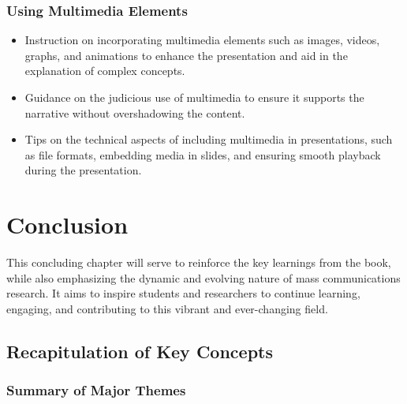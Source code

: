 \documentclass[
]{book}
\begin{document}
\hypertarget{using-multimedia-elements}{%
\subsection*{Using Multimedia Elements}\label{using-multimedia-elements}}

\begin{itemize}
\item
  Instruction on incorporating multimedia elements such as images, videos, graphs, and animations to enhance the presentation and aid in the explanation of complex concepts.
\item
  Guidance on the judicious use of multimedia to ensure it supports the narrative without overshadowing the content.
\item
  Tips on the technical aspects of including multimedia in presentations, such as file formats, embedding media in slides, and ensuring smooth playback during the presentation.
\end{itemize}

\hypertarget{conclusion}{%
\chapter{Conclusion}\label{conclusion}}

This concluding chapter will serve to reinforce the key learnings from the book, while also emphasizing the dynamic and evolving nature of mass communications research. It aims to inspire students and researchers to continue learning, engaging, and contributing to this vibrant and ever-changing field.

\hypertarget{recapitulation-of-key-concepts}{%
\section*{Recapitulation of Key Concepts}\label{recapitulation-of-key-concepts}}

\hypertarget{summary-of-major-themes}{%
\subsection*{Summary of Major Themes}\label{summary-of-major-themes}}
\end{document}
